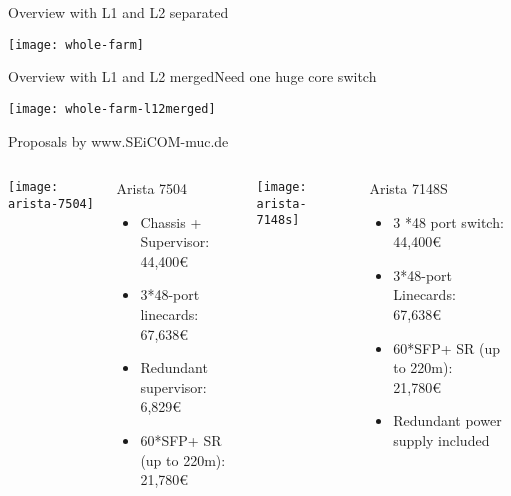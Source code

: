 \begin{frame}{Overview with L1 and L2 separated}{}
	\begin{center} 
		\texttt{[image: whole-farm]}
	\end{center} 
\end{frame}

\begin{frame}{Overview with L1 and L2 merged}{Need one huge core switch}
	\begin{center} 
		\texttt{[image: whole-farm-l12merged]}
	\end{center} 
\end{frame}

\begin{frame}{Proposals by www.SEiCOM-muc.de}{}
	\begin{columns}
			\texttt{[image: arista-7504]}
			\begin{block}{Arista 7504}
				\begin{itemize}
				  \item Chassis + Supervisor: \\44,400€
				  \item 3*48-port linecards: \\67,638€
				  \item Redundant supervisor: \\6,829€
				  \item 60*SFP+ SR (up to 220m): \\21,780€
				\end{itemize}
			\end{block}
						
	    	\texttt{[image: arista-7148s]}
	    	\begin{block}{Arista 7148S}
				\begin{itemize}
				  \item 3 *48 port switch: \\44,400€
				  \item 3*48-port Linecards: \\67,638€
				  \item 60*SFP+ SR (up to 220m): \\21,780€
				  \item Redundant power supply included
				\end{itemize}
			\end{block}
	\end{columns}
\end{frame}






